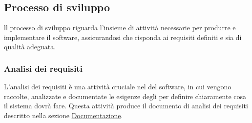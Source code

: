 \subsection{Processo di sviluppo}
\label{subsection:processo_sviluppo}
ll processo di sviluppo riguarda l'insieme di attività necessarie per produrre e implementare il software, assicurandosi che risponda ai requisiti definiti e sia di qualità adeguata.

\subsubsection{Analisi dei requisiti}
\label{subsubsection:analisi_requisiti}
L'analisi dei requisiti è una attività cruciale nel  del software, in cui vengono raccolte, analizzate e documentate le esigenze degli  per definire chiaramente cosa il sistema dovrà fare. 
Questa attività produce il documento di analisi dei requisiti descritto nella sezione \hyperref[subsec:documentazione]{Documentazione}.

